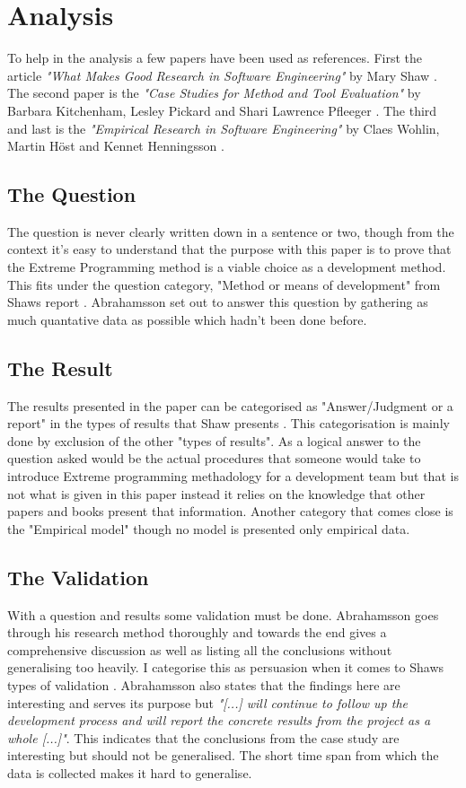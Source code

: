 \section{Analysis}
To help in the analysis a few papers have been used as references. First the
article {\em "What Makes Good Research in Software Engineering"} by Mary Shaw
\cite{shaw2002}. The second paper is the {\em "Case Studies for Method and Tool
Evaluation"} by Barbara Kitchenham, Lesley Pickard and Shari Lawrence Pfleeger
\cite{kitchenham1995}. The third and last is the {\em "Empirical Research in
Software Engineering"} by Claes Wohlin, Martin H\"{o}st and Kennet Henningsson
\cite{wohlin2003}.

\subsection{The Question}
The question is never clearly written down in a sentence or two, though from the
context it's easy to understand that the purpose with this paper is to prove that
the Extreme Programming method is a viable choice as a development method. This
fits under the question category, "Method or means of development" from Shaws
report \cite{shaw2002}. Abrahamsson set out to answer this question by
gathering as much quantative data as possible which hadn't been done before.

\subsection{The Result}
The results presented in the paper can be categorised as "Answer/Judgment or a
report" in the types of results that Shaw presents \cite{shaw2002}. This
categorisation is mainly done by exclusion of the other "types of results". As
a logical answer to the question asked would be the actual procedures that
someone would take to introduce Extreme programming methadology for a development team but that is not what is
given in this paper instead it relies on the knowledge that other papers and books
present that information. Another category that comes close is the "Empirical
model" though no model is presented only empirical data.

\subsection{The Validation}
With a question and results some validation must be done. Abrahamsson goes
through his research method thoroughly and towards the end gives a
comprehensive discussion as well as listing all the conclusions without generalising
too heavily. I categorise this as persuasion when it comes to Shaws types of
validation \cite{shaw2002}. Abrahamsson also states that the findings here are
interesting and serves its purpose but {\em "[...] will continue to follow up
    the development process and will report the concrete results from the
project as a whole [...]"}. This indicates that the conclusions from the
    case study are interesting but should not be generalised. The short time
    span from which the data is collected makes it hard to generalise.

